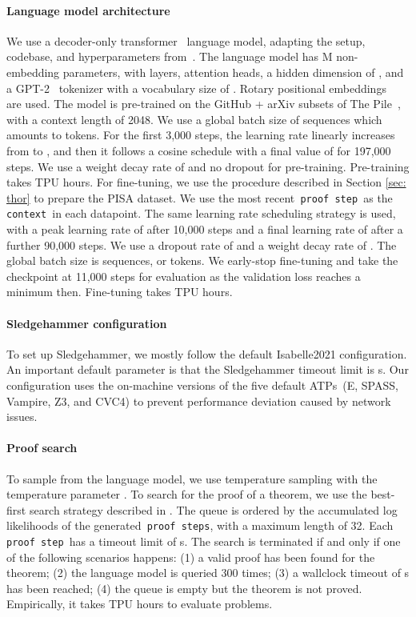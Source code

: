 \documentclass{article}
\begin{document}
\paragraph{Language model architecture}
We use a decoder-only transformer~\citep{vaswani2017attention} language model, adapting the setup, codebase, and hyperparameters from~\citep{gpt-j}.
The language model has M non-embedding parameters, with  layers,  attention heads, a hidden dimension of , and a GPT-2~\citep{radford2019language} tokenizer with a vocabulary size of . Rotary positional embeddings~\citep{rotary} are used.
The model is pre-trained on the GitHub + arXiv subsets of The Pile~\citep{thepile}, with a context length of 2048. We use a global batch size of  sequences which amounts to  tokens. For the first 3,000 steps, the learning rate linearly increases from  to , and then it follows a cosine schedule with a final value of  for 197,000 steps. We use a weight decay rate of  and no dropout for pre-training. Pre-training takes  TPU hours.
For fine-tuning, we use the procedure described in Section \ref{sec: thor} to prepare the PISA dataset. We use the most recent\texttt{ proof step }as the\texttt{ context }in each datapoint.
The same learning rate scheduling strategy is used, with a peak learning rate of  after 10,000 steps and a final learning rate of  after a further 90,000 steps. We use a dropout rate of  and a weight decay rate of . The global batch size is  sequences, or  tokens. We early-stop fine-tuning and take the checkpoint at 11,000 steps for evaluation as the validation loss reaches a minimum then. Fine-tuning takes  TPU hours.


\paragraph{Sledgehammer configuration}
To set up Sledgehammer, we mostly follow the default Isabelle2021 configuration. An important default parameter is that the Sledgehammer timeout limit is s. Our configuration uses the on-machine versions of the five default ATPs~(E, SPASS, Vampire, Z3, and CVC4) to prevent performance deviation caused by network issues.

\paragraph{Proof search}
To sample from the language model, we use temperature sampling with the temperature parameter .
To search for the proof of a theorem, we use the best-first search strategy described in \citep{polu2020generative}.
The queue is ordered by the accumulated log likelihoods of the generated\texttt{ proof steps}, with a maximum length of 32.
Each\texttt{ proof step }has a timeout limit of s.
The search is terminated if and only if one of the following scenarios happens: (1) a valid proof has been found for the theorem; (2) the language model is queried 300 times; (3) a wallclock timeout of s has been reached; (4) the queue is empty but the theorem is not proved. Empirically, it takes  TPU hours to evaluate  problems.
\end{document}

